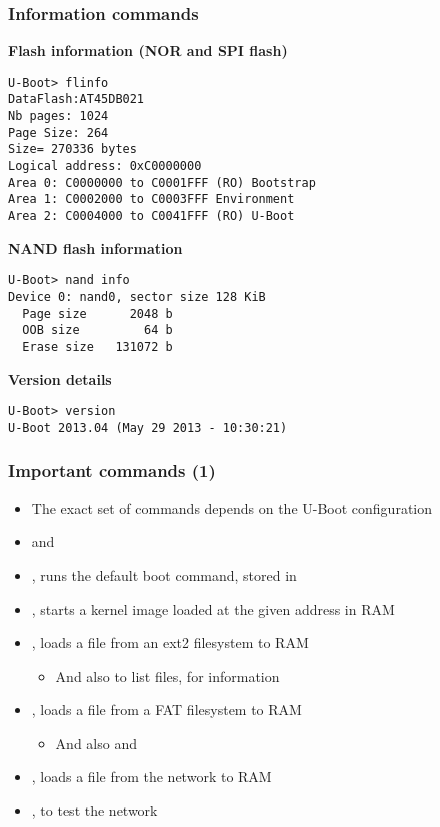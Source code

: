 \begin{frame}[fragile]
  \frametitle{Information commands}
\scriptsize
  {\bf Flash information (NOR and SPI flash)}
\begin{verbatim}
U-Boot> flinfo
DataFlash:AT45DB021
Nb pages: 1024
Page Size: 264
Size= 270336 bytes
Logical address: 0xC0000000
Area 0: C0000000 to C0001FFF (RO) Bootstrap
Area 1: C0002000 to C0003FFF Environment
Area 2: C0004000 to C0041FFF (RO) U-Boot
\end{verbatim}
  {\bf NAND flash information}
\begin{verbatim}
U-Boot> nand info
Device 0: nand0, sector size 128 KiB
  Page size      2048 b
  OOB size         64 b
  Erase size   131072 b
\end{verbatim}
  {\bf Version details}
\begin{verbatim}
U-Boot> version
U-Boot 2013.04 (May 29 2013 - 10:30:21)
\end{verbatim}
\end{frame}

\begin{frame}
  \frametitle{Important commands (1)}
  \begin{itemize}
  \item The exact set of commands depends on the U-Boot configuration
  \item {} and 
  \item {}, runs the default boot command, stored in
  \item {}, starts a kernel image loaded at the
    given address in RAM
  \item {}, loads a file from an ext2 filesystem to RAM
    \begin{itemize}
    \item And also  to list files,  for
      information
    \end{itemize}
  \item {}, loads a file from a FAT filesystem to RAM
    \begin{itemize}
    \item And also  and 
    \end{itemize}
  \item {}, loads a file from the network to RAM
  \item {}, to test the network
  \end{itemize}
\end{frame}


